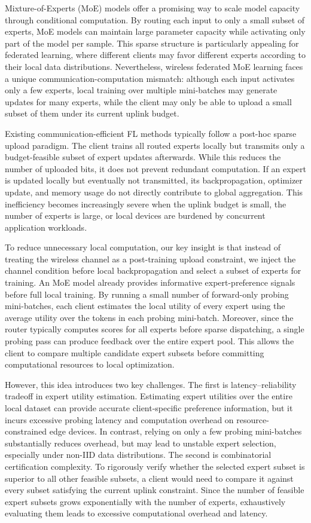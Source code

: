 \documentclass[conference]{IEEEtran}
\begin{document}
Mixture-of-Experts (MoE) models offer a promising way to scale model capacity through conditional computation. By routing each input to only a small subset of experts, MoE models can maintain large parameter capacity while activating only part of the model per sample. This sparse structure is particularly appealing for federated learning, where different clients may favor different experts according to their local data distributions. Nevertheless, wireless federated MoE learning faces a unique communication-computation mismatch: although each input activates only a few experts, local training over multiple mini-batches may generate updates for many experts, while the client may only be able to upload a small subset of them under its current uplink budget.

Existing communication-efficient FL methods typically follow a post-hoc sparse upload paradigm. The client trains all routed experts locally but transmits only a budget-feasible subset of expert updates afterwards. While this reduces the number of uploaded bits, it does not prevent redundant computation. If an expert is updated locally but eventually not transmitted, its backpropagation, optimizer update, and memory usage do not directly contribute to global aggregation. This inefficiency becomes increasingly severe when the uplink budget is small, the number of experts is large, or local devices are burdened by concurrent application workloads.

To reduce unnecessary local computation, our key insight is that instead of treating the wireless channel as a post-training upload constraint, we inject the channel condition before local backpropagation and select a subset of experts for training. An MoE model already provides informative expert-preference signals before full local training. By running a small number of forward-only probing mini-batches, each client estimates the local utility of every expert using the average utility over the tokens in each probing mini-batch. Moreover, since the router typically computes scores for all experts before sparse dispatching, a single probing pass can produce feedback over the entire expert pool. This allows the client to compare multiple candidate expert subsets before committing computational resources to local optimization.

However, this idea introduces two key challenges. The first is latency--reliability tradeoff in expert utility estimation. Estimating expert utilities over the entire local dataset can provide accurate client-specific preference information, but it incurs excessive probing latency and computation overhead on resource-constrained edge devices. In contrast, relying on only a few probing mini-batches substantially reduces overhead, but may lead to unstable expert selection, especially under non-IID data distributions. The second is combinatorial certification complexity. To rigorously verify whether the selected expert subset is superior to all other feasible subsets, a client would need to compare it against every subset satisfying the current uplink constraint. Since the number of feasible expert subsets grows exponentially with the number of experts, exhaustively evaluating them leads to excessive computational overhead and latency.
\end{document}
